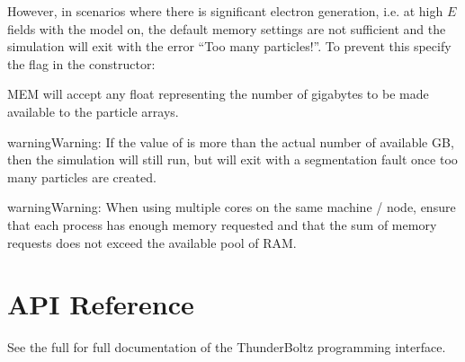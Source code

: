 \documentclass[letterpaper,10pt,english,openany,oneside]{sphinxmanual}
\begin{document}
\sphinxAtStartPar
However, in scenarios where there is significant electron generation,
i.e. at high \(E\) fields with the  model on,
the default memory settings are not sufficient and the simulation
will exit with the error “Too many particles!”. To prevent this
specify the  flag in the {\hyperref[\detokenize{api/pytb.ThunderBoltz:pytb.ThunderBoltz}]{}} constructor:

\begin{sphinxVerbatim}[commandchars=\\\{\}]
  
        
\end{sphinxVerbatim}

\sphinxAtStartPar
MEM will accept any float representing the number of gigabytes
to be made available to the particle arrays.

\begin{sphinxadmonition}{warning}{Warning:}
\sphinxAtStartPar
If the value of  is more than the actual number of
available GB, then the simulation will still run, but will
exit with a segmentation fault once too many particles are
created.
\end{sphinxadmonition}

\begin{sphinxadmonition}{warning}{Warning:}
\sphinxAtStartPar
When using multiple cores on the same machine / node, ensure
that each process has enough memory requested and that
the sum of memory requests does not exceed the available
pool of RAM.
\end{sphinxadmonition}


\chapter{API Reference}
\label{\detokenize{index:api-reference}}
\sphinxAtStartPar
See the full {\hyperref[\detokenize{ref::doc}]{}} for full documentation
of the ThunderBoltz programming interface.
\end{document}
